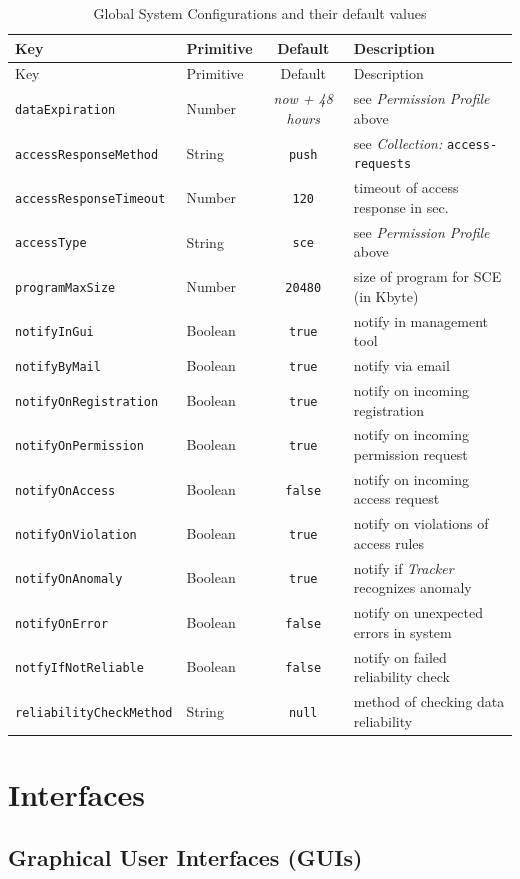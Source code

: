 \documentclass[12pt,english,a4paper,titlepage,cleardoublepage=empty,dottedtoc]{report}
\begin{document}
\begin{longtable}[]{@{}llcl@{}}
\caption{Global System Configurations and their default values
\label{tbl:spec_system-default-config}}\tabularnewline
\toprule
Key & Primitive & Default & Description\tabularnewline
\midrule
\endfirsthead
\toprule
Key & Primitive & Default & Description\tabularnewline
\midrule
\endhead
\texttt{dataExpiration} & Number & \emph{now + 48 hours} & see
\emph{Permission Profile} above\tabularnewline
\texttt{accessResponseMethod} & String &
\texttt{\textquotesingle{}push\textquotesingle{}} & see
\emph{Collection:} \texttt{access-requests}\tabularnewline
\texttt{accessResponseTimeout} & Number & \texttt{120} & timeout of
access response in sec.\tabularnewline
\texttt{accessType} & String &
\texttt{\textquotesingle{}sce\textquotesingle{}} & see \emph{Permission
Profile} above\tabularnewline
\texttt{programMaxSize} & Number & \texttt{20480} & size of program for
SCE (in Kbyte)\tabularnewline
\texttt{notifyInGui} & Boolean & \texttt{true} & notify in management
tool\tabularnewline
\texttt{notifyByMail} & Boolean & \texttt{true} & notify via
email\tabularnewline
\texttt{notifyOnRegistration} & Boolean & \texttt{true} & notify on
incoming registration\tabularnewline
\texttt{notifyOnPermission} & Boolean & \texttt{true} & notify on
incoming permission request\tabularnewline
\texttt{notifyOnAccess} & Boolean & \texttt{false} & notify on incoming
access request\tabularnewline
\texttt{notifyOnViolation} & Boolean & \texttt{true} & notify on
violations of access rules\tabularnewline
\texttt{notifyOnAnomaly} & Boolean & \texttt{true} & notify if
\emph{Tracker} recognizes anomaly\tabularnewline
\texttt{notifyOnError} & Boolean & \texttt{false} & notify on unexpected
errors in system\tabularnewline
\texttt{notfyIfNotReliable} & Boolean & \texttt{false} & notify on
failed reliability check\tabularnewline
\texttt{reliabilityCheckMethod} & String & \texttt{null} & method of
checking data reliability\tabularnewline
\bottomrule
\end{longtable}

\section{Interfaces}\label{interfaces-1}

\subsection{Graphical User Interfaces
(GUIs)}\label{graphical-user-interfaces-guis}
\end{document}
